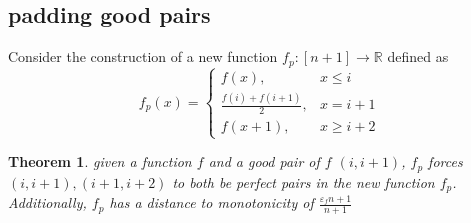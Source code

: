 \documentclass[11pt]{article}
\newtheorem{theorem}{Theorem}[section]
\begin{document}
\subsection{padding good pairs}

Consider the construction of a new function 
\(f_p:[n+1]\to \mathbb R\) defined as \begin{equation}
        f_p(x) = \begin{cases}
            f(x),& x\leq i\\
            \frac{f(i)+f(i+1)}{2},& x=i+1\\
            f(x+1),&x\geq i+2
        \end{cases}
    \end{equation}

\begin{theorem}
    given a function \(f\) and a good pair of \(f\) \((i,i+1)\), \(f_p\)
    forces \((i,i+1),(i+1,i+2)\) to both be perfect pairs in the new function \(f_p\).
    Additionally, \(f_p\) has a distance to monotonicity of \(\frac{\varepsilon_fn + 1}{n+1}\)
    
\end{theorem}
\end{document}
